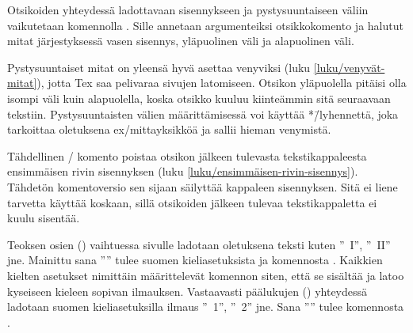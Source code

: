 Otsikoiden yhteydessä ladottavaan sisennykseen ja pystysuuntaiseen
väliin vaikutetaan komennolla . Sille annetaan
argumenteiksi otsikkokomento ja halutut mitat järjestyksessä vasen
sisennys, yläpuolinen väli ja alapuolinen väli.

\begin{koodilohkosis}
\end{koodilohkosis}

\noindent
Pystysuuntaiset mitat on yleensä hyvä asettaa venyviksi (luku
\ref{luku/venyvät-mitat}), jotta Tex saa pelivaraa sivujen latomiseen.
Otsikon yläpuolella pitäisi olla isompi väli kuin alapuolella, koska
otsikko kuuluu kiinteämmin sitä seuraavaan tekstiin. Pystysuuntaisten
välien määrittämisessä voi käyttää *\=/lyhennettä, joka tarkoittaa
oletuksena ex\-/mittayksikköä ja sallii hieman venymistä.

\begin{koodilohkosis}
\end{koodilohkosis}

\noindent
Tähdellinen \-/ komento poistaa otsikon jälkeen
tulevasta tekstikappaleesta ensimmäisen rivin sisennyksen (luku
\ref{luku/ensimmäisen-rivin-sisennys}). Tähdetön komentoversio
 sen sijaan säilyttää kappaleen sisennyksen. Sitä
ei liene tarvetta käyttää koskaan, sillä otsikoiden jälkeen tulevaa
tekstikappaletta ei kuulu sisentää.

Teoksen osien () vaihtuessa sivulle ladotaan oletuksena
teksti kuten ''\partname~I'', ''\partname~II'' jne. Mainittu sana
''\partname'' tulee suomen kieliasetuksista ja komennosta
. Kaikkien kielten asetukset nimittäin määrittelevät
komennon  siten, että se sisältää ja latoo kyseiseen
kieleen sopivan ilmauksen. Vastaavasti päälukujen ()
yhteydessä ladotaan suomen kieliasetuksilla ilmaus ''\chaptername~1'',
''\chaptername~2'' jne. Sana ''\chaptername'' tulee komennosta
.

